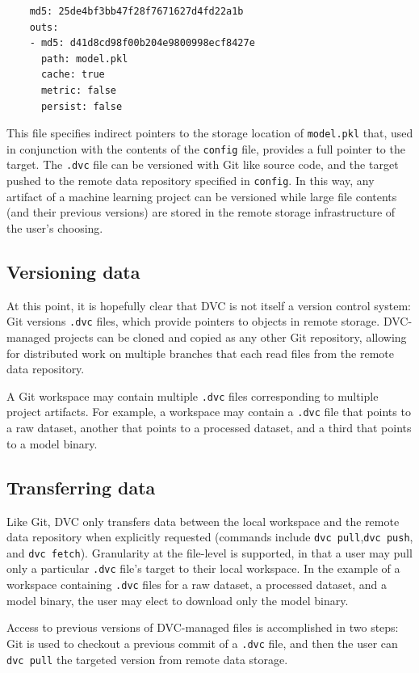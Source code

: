 \documentclass[10pt,sigconf, authordraft]{acmart}
\begin{document}
\begin{verbatim}
    md5: 25de4bf3bb47f28f7671627d4fd22a1b
    outs:
    - md5: d41d8cd98f00b204e9800998ecf8427e
      path: model.pkl
      cache: true
      metric: false
      persist: false
\end{verbatim}

This file specifies indirect pointers to the storage location of \verb|model.pkl| that, used in conjunction with the contents of the \verb|config| file, provides a full pointer to the target. The \verb|.dvc| file can be versioned with Git like source code, and the target pushed to the remote data repository specified in \verb|config|. In this way, any artifact of a machine learning project can be versioned while large file contents (and their previous versions) are stored in the remote storage infrastructure of the user's choosing. 

\subsection{Versioning data} \label{version}
At this point, it is hopefully clear that DVC is not itself a version control system: Git versions \verb|.dvc| files, which provide pointers to objects in remote storage. DVC-managed projects can be cloned and copied as any other Git repository, allowing for distributed work on multiple branches that each read files from the remote data repository. 

A Git workspace may contain multiple \verb|.dvc| files corresponding to multiple project artifacts. For example, a workspace may contain a \verb|.dvc| file that points to a raw dataset, another that points to a processed dataset, and a third that points to a model binary. 

\subsection{Transferring data} \label{transfer}
Like Git, DVC only transfers data between the local workspace and the remote data repository when explicitly requested (commands include \verb|dvc pull|,\verb|dvc push|, and \verb|dvc fetch|). Granularity at the file-level is supported, in that a user may pull only a particular \verb|.dvc| file's target to their local workspace. In the example of a workspace containing \verb|.dvc| files for a raw dataset, a processed dataset, and a model binary, the user may elect to download only the model binary.

Access to previous versions of DVC-managed files is accomplished in two steps: Git is used to checkout a previous commit of a \verb|.dvc| file, and then the user can \verb|dvc pull| the targeted version from remote data storage. 
\end{document}
